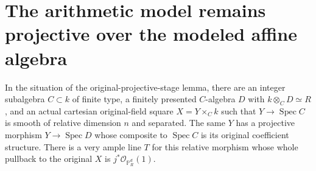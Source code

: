 \section{The arithmetic model remains projective over the modeled affine algebra}

\begin{lemma}
\label{lem:kn-relative-arithmetic-original-geometric-model}
\leanok
In the situation of the original-projective-stage lemma, there are
an integer subalgebra $C\subset k$ of finite type, a finitely
presented $C$-algebra $D$ with $k\otimes_C D\simeq R$, and an
actual cartesian original-field square $X=Y\times_C k$ such that
$Y\to\operatorname{Spec}C$ is smooth of relative dimension $n$
and separated.  The same $Y$ has a projective morphism
$Y\to\operatorname{Spec}D$ whose composite to
$\operatorname{Spec}C$ is its original coefficient structure.
There is a very ample line $T$ for this relative morphism whose
whole pullback to the original $X$ is
$j^*\mathcal O_{\mathbb P_R^d}(1)$.
\end{lemma}
